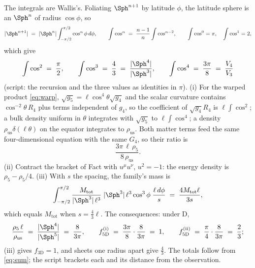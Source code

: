 The integrals are Wallis's. Foliating $\Sph^{n+1}$ by latitude $\phi$, the latitude sphere is an $\Sph^{n}$ of radius $\cos\phi$, so
\[
|\Sph^{n+1}| \;=\; |\Sph^{n}|\int_{-\pi/2}^{\pi/2}\cos^{n}\phi\,d\phi, \qquad \int\cos^{n} \;=\; \frac{n-1}{n}\int\cos^{n-2}, \qquad \int\cos^{0} = \pi, \quad \int\cos^{1} = 2,
\]
which give
\[
\int\cos^{2} \;=\; \frac{\pi}{2}, \qquad \int\cos^{3} \;=\; \frac{4}{3} \;=\; \frac{|\Sph^{4}|}{|\Sph^{3}|}, \qquad \int\cos^{4} \;=\; \frac{3\pi}{8} \;=\; \frac{V_{4}}{V_{3}}
\]
(script: the recursion and the three values as identities in $\pi$). (i) For the warped product \eqref{eq:warp}, $\sqrt{g_{5}} = \ell\cos^{4}\theta\sqrt{g_{4}}$ and the scalar curvature contains $\cos^{-2}\theta\,R_{4}$ plus terms independent of $g_{4}$, so the coefficient of $\sqrt{g_{4}}R_{4}$ is $\ell\int\cos^{2}$; a bulk density uniform in $\theta$ integrates with $\sqrt{g_{5}}$ to $\ell\int\cos^{4}$; a density $\rho_{\mathrm{us}}\delta(\ell\theta)$ on the equator integrates to $\rho_{\mathrm{us}}$. Both matter terms feed the same four-dimensional equation with the same $G_{4}$, so their ratio is
\[
\frac{3\pi\,\ell\,\rho_{5}}{8\,\rho_{\mathrm{us}}}.
\]
(ii) Contract the bracket of Fact  with $u^{\mu}u^{\nu}$, $u^{2} = -1$: the energy density is $\rho_{5} - \rho_{5}/4$. (iii) With $s$ the spacing, the family's mass is
\[
\int_{-\pi/2}^{\pi/2}\frac{M_{\mathrm{tot}}}{|\Sph^{3}|\,\ell^{3}}\;|\Sph^{3}|\,\ell^{3}\cos^{3}\phi\;\frac{\ell\,d\phi}{s}
\;=\; \frac{4M_{\mathrm{tot}}\ell}{3s},
\]
which equals $M_{\mathrm{tot}}$ when $s = \tfrac{4}{3}\ell$. The consequences: under D,
\[
\frac{\rho_{5}\,\ell}{\rho_{\mathrm{us}}} \;=\; \frac{|\Sph^{4}|}{|\Sph^{5}|} \;=\; \frac{8}{3\pi}, \qquad
f_{5\mathrm{D}}^{\mathrm{(i)}} \;=\; \frac{3\pi}{8}\cdot\frac{8}{3\pi} \;=\; 1, \qquad
f_{5\mathrm{D}}^{\mathrm{(ii)}} \;=\; \frac{\pi}{4}\cdot\frac{8}{3\pi} \;=\; \frac{2}{3};
\]
(iii) gives $f_{3\mathrm{D}} = 1$, and sheets one radius apart give $\tfrac{4}{3}$. The totals follow from \eqref{eq:sum}; the script brackets each and its distance from the observation.
